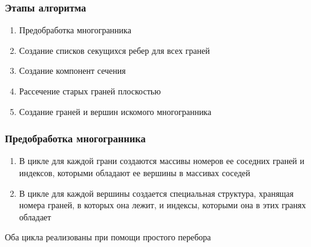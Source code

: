 \documentclass[a4paper,12pt, titlepage]{article}
\begin{document}
\subsubsection{Этапы алгоритма}
	\begin{flushleft}
		\begin{enumerate}
			\item Предобработка многогранника
			\item Создание списков секущихся ребер для всех граней
			\item Создание компонент сечения
			\item Рассечение старых граней плоскостью
			\item Создание граней и вершин искомого многогранника
		\end{enumerate}
	\end{flushleft}

\subsubsection{Предобработка многогранника}
	\begin{flushleft}
		\begin{enumerate}
			\item В цикле для каждой грани создаются массивы номеров ее соседних граней и 
			индексов, которыми обладают ее вершины в массивах соседей
			\item В цикле для каждой вершины создается специальная структура, хранящая 
			номера граней, в которых она лежит, и индексы, которыми она в этих гранях 
			обладает
		\end{enumerate}
	\end{flushleft}
	\begin{flushleft}
		Оба цикла реализованы при помощи простого перебора
	\end{flushleft}
\end{document}
